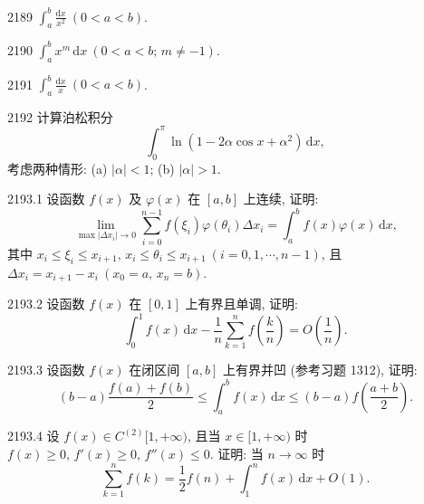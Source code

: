 \begin{prob}[M]{2189}
$\displaystyle\int_{a}^{b} \frac{\mathrm{d}x}{x^2} \ (0 < a < b)$.
\end{prob}

\begin{prob}[M]{2190}
$\displaystyle\int_{a}^{b} x^m\,\mathrm{d}x \ (0 < a < b; \, m \neq -1)$.
\end{prob}

\begin{prob}[S]{2191}
$\displaystyle\int_{a}^{b} \frac{\mathrm{d}x}{x} \ (0 < a < b)$.
\end{prob}

\begin{prob}[M]{2192}
计算泊松积分
\[
\int_{0}^{\pi} \ln(1 - 2\alpha\cos x + \alpha^2)\,\mathrm{d}x,
\]
考虑两种情形: (a) $|\alpha| < 1$; \qquad (b) $|\alpha| > 1$.
\end{prob}

\begin{prob}[M]{2193.1}
设函数 $f(x)$ 及 $\varphi(x)$ 在 $[a, b]$ 上连续, 证明:
\[
\lim_{\max|\Delta x_i| \to 0} \sum_{i=0}^{n-1} f(\xi_i)\varphi(\theta_i)\Delta x_i = \int_{a}^{b} f(x)\varphi(x)\,\mathrm{d}x,
\]
其中 $x_i \leqslant \xi_i \leqslant x_{i+1}, \, x_i \leqslant \theta_i \leqslant x_{i+1} \ (i = 0, 1, \cdots, n-1)$, 且 $\Delta x_i = x_{i+1} - x_i \ (x_0 = a, \, x_n = b)$.
\end{prob}

\begin{prob}[M]{2193.2}
设函数 $f(x)$ 在 $[0, 1]$ 上有界且单调, 证明:
\[
\int_{0}^{1} f(x)\,\mathrm{d}x - \frac{1}{n} \sum_{k=1}^{n} f\left(\frac{k}{n}\right) = O\left(\frac{1}{n}\right).
\]
\end{prob}

\begin{prob}[M]{2193.3}
设函数 $f(x)$ 在闭区间 $[a, b]$ 上有界并凹 (参考习题 1312), 证明:
\[
(b - a)\frac{f(a) + f(b)}{2} \leqslant \int_{a}^{b} f(x)\,\mathrm{d}x \leqslant (b - a)f\left(\frac{a + b}{2}\right).
\]
\end{prob}

\begin{prob}[M]{2193.4}
设 $f(x) \in C^{(2)}[1, +\infty)$, 且当 $x \in [1, +\infty)$ 时 $f(x) \geqslant 0, \, f'(x) \geqslant 0, \, f''(x) \leqslant 0$. 证明: 当 $n \to \infty$ 时
\[
\sum_{k=1}^{n} f(k) = \frac{1}{2}f(n) + \int_{1}^{n} f(x)\,\mathrm{d}x + O(1).
\]
\end{prob}

